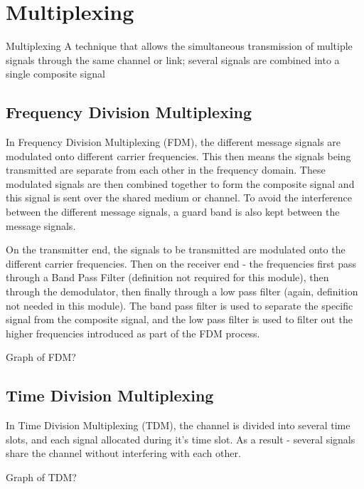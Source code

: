 \section{Multiplexing}
\begin{define}
\item[Multiplexing] A technique that allows the simultaneous transmission of multiple signals through the same channel or link; several signals are combined into a single composite signal
\end{define}

\subsection{Frequency Division Multiplexing}
In Frequency Division Multiplexing (FDM), the different message signals are modulated onto different carrier frequencies. This then means the signals being transmitted are separate from each other in the frequency domain. These modulated signals are then combined together to form the composite signal and this signal is sent over the shared medium or channel. To avoid the interference between the different message signals, a guard band is also kept between the message signals.

On the transmitter end, the signals to be transmitted are modulated onto the different carrier frequencies. Then on the receiver end - the frequencies first pass through a Band Pass Filter (definition not required for this module), then through the demodulator, then finally through a low pass filter (again, definition not needed in this module). The band pass filter is used to separate the specific signal from the composite signal, and the low pass filter is used to filter out the higher frequencies introduced as part of the FDM process.

\begin{todo}
Graph of FDM?
\end{todo}

\subsection{Time Division Multiplexing}
In Time Division Multiplexing (TDM), the channel is divided into several time slots, and each signal allocated during it's time slot. As a result - several signals share the channel without interfering with each other. 
\begin{todo}
Graph of TDM?
\end{todo}


